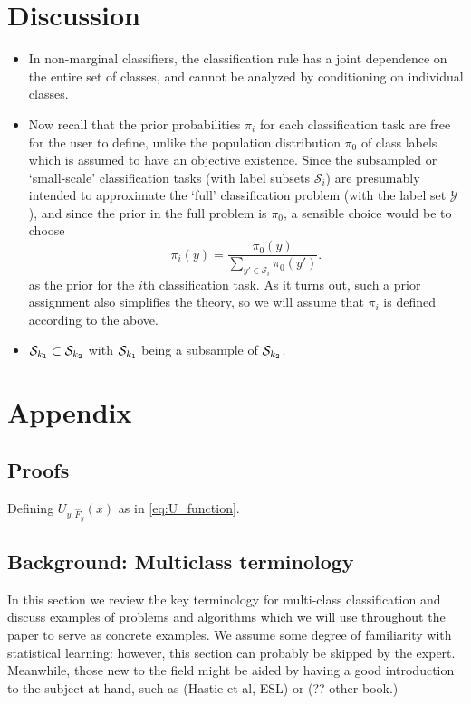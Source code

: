 \documentclass[12pt]{article}
\begin{document}
\section{Discussion}

\begin{itemize}
\item In non-marginal classifiers, the classification rule has
a joint dependence on the entire set of classes, and cannot be
analyzed by conditioning on individual classes.
\item Now recall that the prior probabilities $\pi_i$ for each
classification task are free for the user to define, unlike the
population distribution $\pi_0$ of class labels which is assumed to
have an objective existence.  Since the subsampled or `small-scale'
classification tasks (with label subsets $\mathcal{S}_i$) are
presumably intended to approximate the `full' classification problem
(with the label set $\mathcal{Y}$), and since the prior in the full
problem is $\pi_0$, a sensible choice would be to choose
\[
\pi_i(y) = \frac{\pi_0(y)}{\sum_{y' \in \mathcal{S}_i} \pi_0(y')}.
\]
as the prior for the $i$th classification task.  As it turns out, such
a prior assignment also simplifies the theory, so we will assume that
$\pi_i$ is defined according to the above.
\item $\mathcal{S}_{k_1} \subset
\mathcal{S}_{k_2}$ with $\mathcal{S}_{k_1}$ being a subsample of
$\mathcal{S}_{k_2}$.
\end{itemize}

\appendix
\section{Appendix}
\subsection{Proofs}

\begin{lemma}\label{lemma:U_function}
Defining $U_{y,\hat{F}_y}(x)$ as in \eqref{eq:U_function}.
\end{lemma}

\subsection{Background: Multiclass terminology}

In this section we review the key terminology for multi-class
classification and discuss examples of problems and algorithms which
we will use throughout the paper to serve as concrete examples.  We
assume some degree of familiarity with statistical learning: however,
this section can probably be skipped by the expert.  Meanwhile, those
new to the field might be aided by having a good introduction to the
subject at hand, such as (Hastie et al, ESL) or (?? other book.)
\end{document}
